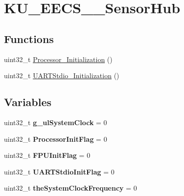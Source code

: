 \hypertarget{group___k_u___e_e_c_s__690___sensor_hub}{}\section{K\+U\+\_\+\+E\+E\+C\+S\+\_\+\_\+\+Sensor\+Hub}
\label{group___k_u___e_e_c_s__690___sensor_hub}
\subsection*{Functions}
\begin{DoxyCompactItemize}
\item 
uint32\+\_\+t \hyperlink{group___k_u___e_e_c_s__690___sensor_hub_ga37e6b25c68a0447e926dff487b41af1b}{Processor\+\_\+\+Initialization} ()
\item 
uint32\+\_\+t \hyperlink{group___k_u___e_e_c_s__690___sensor_hub_ga1dd51a919af55c92d37762b391769060}{U\+A\+R\+T\+Stdio\+\_\+\+Initialization} ()
\end{DoxyCompactItemize}
\subsection*{Variables}
\begin{DoxyCompactItemize}
\item 
\hypertarget{group___k_u___e_e_c_s__690___sensor_hub_ga70cec308a737e679bd8f0d86a77a8e19}{}uint32\+\_\+t {\bfseries g\+\_\+ul\+System\+Clock} = 0\label{group___k_u___e_e_c_s__690___sensor_hub_ga70cec308a737e679bd8f0d86a77a8e19}

\item 
\hypertarget{group___k_u___e_e_c_s__690___sensor_hub_gaee68a3d4b94a9acc6e8de2886b5ccef4}{}uint32\+\_\+t {\bfseries Processor\+Init\+Flag} = 0\label{group___k_u___e_e_c_s__690___sensor_hub_gaee68a3d4b94a9acc6e8de2886b5ccef4}

\item 
\hypertarget{group___k_u___e_e_c_s__690___sensor_hub_ga893ce354911280fd6c7c34d2205cf806}{}uint32\+\_\+t {\bfseries F\+P\+U\+Init\+Flag} = 0\label{group___k_u___e_e_c_s__690___sensor_hub_ga893ce354911280fd6c7c34d2205cf806}

\item 
\hypertarget{group___k_u___e_e_c_s__690___sensor_hub_gaf96ce27f4fe1fae4424cbc5fbe5ba66a}{}uint32\+\_\+t {\bfseries U\+A\+R\+T\+Stdio\+Init\+Flag} = 0\label{group___k_u___e_e_c_s__690___sensor_hub_gaf96ce27f4fe1fae4424cbc5fbe5ba66a}

\item 
\hypertarget{group___k_u___e_e_c_s__690___sensor_hub_gae16fd1c981f5645757858782f69461c1}{}uint32\+\_\+t {\bfseries the\+System\+Clock\+Frequency} = 0\label{group___k_u___e_e_c_s__690___sensor_hub_gae16fd1c981f5645757858782f69461c1}

\end{DoxyCompactItemize}


